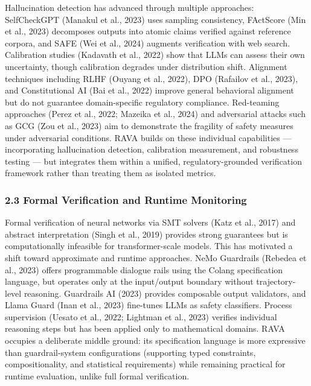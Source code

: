 \documentclass[
]{article}
\begin{document}
Hallucination detection has advanced through multiple approaches: SelfCheckGPT (Manakul et al., 2023) uses sampling consistency, FActScore (Min et al., 2023) decomposes outputs into atomic claims verified against reference corpora, and SAFE (Wei et al., 2024) augments verification with web search. Calibration studies (Kadavath et al., 2022) show that LLMs can assess their own uncertainty, though calibration degrades under distribution shift. Alignment techniques including RLHF (Ouyang et al., 2022), DPO (Rafailov et al., 2023), and Constitutional AI (Bai et al., 2022) improve general behavioral alignment but do not guarantee domain-specific regulatory compliance. Red-teaming approaches (Perez et al., 2022; Mazeika et al., 2024) and adversarial attacks such as GCG (Zou et al., 2023) aim to demonstrate the fragility of safety measures under adversarial conditions. RAVA builds on these individual capabilities --- incorporating hallucination detection, calibration measurement, and robustness testing --- but integrates them within a unified, regulatory-grounded verification framework rather than treating them as isolated metrics.

\hypertarget{23-formal-verification-and-runtime-monitoring}{%
\subsubsection{2.3 Formal Verification and Runtime Monitoring}\label{23-formal-verification-and-runtime-monitoring}}

Formal verification of neural networks via SMT solvers (Katz et al., 2017) and abstract interpretation (Singh et al., 2019) provides strong guarantees but is computationally infeasible for transformer-scale models. This has motivated a shift toward approximate and runtime approaches. NeMo Guardrails (Rebedea et al., 2023) offers programmable dialogue rails using the Colang specification language, but operates only at the input/output boundary without trajectory-level reasoning. Guardrails AI (2023) provides composable output validators, and Llama Guard (Inan et al., 2023) fine-tunes LLMs as safety classifiers. Process supervision (Uesato et al., 2022; Lightman et al., 2023) verifies individual reasoning steps but has been applied only to mathematical domains. RAVA occupies a deliberate middle ground: its specification language is more expressive than guardrail-system configurations (supporting typed constraints, compositionality, and statistical requirements) while remaining practical for runtime evaluation, unlike full formal verification.
\end{document}
